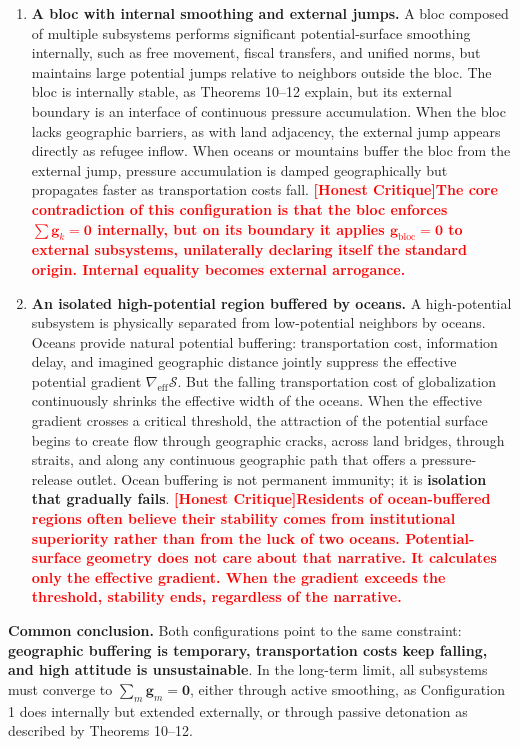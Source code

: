 \documentclass[12pt,a4paper]{article}
\theoremstyle{remark}
\newcommand{\honestcrit}[1]{%
    \textcolor{red}{\textbf{[Honest Critique]#1}}%
}
\begin{document}
\begin{enumerate}[label=\textbf{Configuration \arabic*}, leftmargin=*]
    \item \textbf{A bloc with internal smoothing and external jumps.} A bloc composed of multiple subsystems performs significant potential-surface smoothing internally, such as free movement, fiscal transfers, and unified norms, but maintains large potential jumps relative to neighbors outside the bloc. The bloc is internally stable, as Theorems 10--12 explain, but its external boundary is an interface of continuous pressure accumulation. When the bloc lacks geographic barriers, as with land adjacency, the external jump appears directly as refugee inflow. When oceans or mountains buffer the bloc from the external jump, pressure accumulation is damped geographically but propagates faster as transportation costs fall. \honestcrit{The core contradiction of this configuration is that the bloc enforces $\sum \mathbf{g}_k = \mathbf{0}$ internally, but on its boundary it applies $\mathbf{g}_{\text{bloc}} = \mathbf{0}$ to external subsystems, unilaterally declaring itself the standard origin. Internal equality becomes external arrogance.}
    
    \item \textbf{An isolated high-potential region buffered by oceans.} A high-potential subsystem is physically separated from low-potential neighbors by oceans. Oceans provide natural potential buffering: transportation cost, information delay, and imagined geographic distance jointly suppress the effective potential gradient $\nabla_{\text{eff}}\mathcal{S}$. But the falling transportation cost of globalization continuously shrinks the effective width of the oceans. When the effective gradient crosses a critical threshold, the attraction of the potential surface begins to create flow through geographic cracks, across land bridges, through straits, and along any continuous geographic path that offers a pressure-release outlet. Ocean buffering is not permanent immunity; it is \textbf{isolation that gradually fails}. \honestcrit{Residents of ocean-buffered regions often believe their stability comes from institutional superiority rather than from the luck of two oceans. Potential-surface geometry does not care about that narrative. It calculates only the effective gradient. When the gradient exceeds the threshold, stability ends, regardless of the narrative.}
\end{enumerate}

\textbf{Common conclusion.} Both configurations point to the same constraint: \textbf{geographic buffering is temporary, transportation costs keep falling, and high attitude is unsustainable}. In the long-term limit, all subsystems must converge to $\sum_m \mathbf{g}_m = \mathbf{0}$, either through active smoothing, as Configuration 1 does internally but extended externally, or through passive detonation as described by Theorems 10--12.
\end{document}

